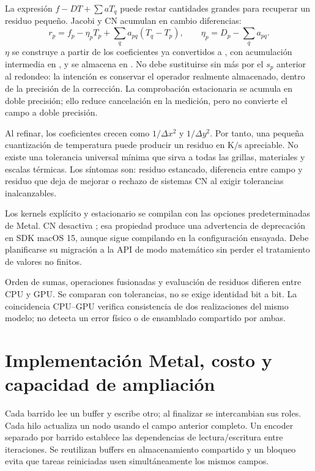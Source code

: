 \documentclass[11pt,a4paper]{article}
\newcommand{\code}[1]{\texttt{\detokenize{#1}}}
\begin{document}
La expresión $f-DT+\sum aT_q$ puede restar cantidades grandes para recuperar
un residuo pequeño. Jacobi y CN acumulan en cambio diferencias:
\begin{equation}
 r_p=f_p-\eta_pT_p+\sum_q a_{pq}(T_q-T_p),\qquad
 \eta_p=D_p-\sum_q a_{pq}.
 \label{eq:stablecalc}
\end{equation}
$\eta$ se construye a partir de los coeficientes ya convertidos a \code{Float},
con acumulación intermedia en \code{Double}, y se almacena en \code{Float}.
No debe sustituirse sin más por el $s_p$ anterior al redondeo: la intención
es conservar el operador realmente almacenado, dentro de la precisión de
la corrección. La comprobación estacionaria se acumula en doble precisión;
ello reduce cancelación en la medición, pero no convierte el campo a doble
precisión.

Al refinar, los coeficientes crecen como $1/\Delta x^2$ y $1/\Delta y^2$.
Por tanto, una pequeña cuantización de temperatura puede producir un residuo
en $\mathrm{K/s}$ apreciable. No existe una tolerancia universal mínima que
sirva a todas las grillas, materiales y escalas térmicas. Los síntomas son:
residuo estancado, diferencia entre campo y residuo que deja de mejorar o
rechazo de sistemas CN al exigir tolerancias inalcanzables.

Los kernels explícito y estacionario se compilan con las opciones
predeterminadas de Metal. CN desactiva \code{fastMathEnabled}; esa propiedad
produce una advertencia de deprecación en SDK macOS 15, aunque sigue
compilando en la configuración ensayada. Debe planificarse su migración a la
API de modo matemático sin perder el tratamiento de valores no finitos.

Orden de sumas, operaciones fusionadas y evaluación de residuos difieren
entre CPU y GPU. Se comparan con tolerancias, no se exige identidad bit a bit.
La coincidencia CPU--GPU verifica consistencia de dos realizaciones del mismo
modelo; no detecta un error físico o de ensamblado compartido por ambas.

\section{Implementación Metal, costo y capacidad de ampliación}
\label{sec:gpu}
Cada barrido lee un buffer y escribe otro; al finalizar se intercambian sus
roles. Cada hilo actualiza un nodo usando el campo anterior completo. Un
encoder separado por barrido establece las dependencias de lectura/escritura
entre iteraciones. Se reutilizan buffers en almacenamiento compartido y un
bloqueo evita que tareas reiniciadas usen simultáneamente los mismos campos.
\end{document}

